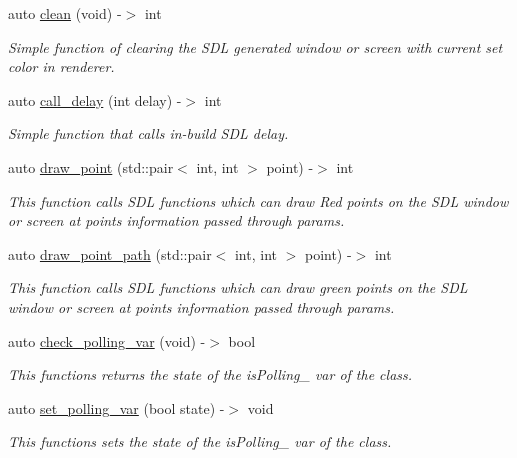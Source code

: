 \begin{DoxyCompactItemize}
auto \hyperlink{class_sdl__wrapper_a102c591db34f2174164b151e5f0bee65}{clean} (void) -\/$>$ int
\begin{DoxyCompactList}\small\item\em Simple function of clearing the S\+DL generated window or screen with current set color in renderer. \end{DoxyCompactList}\item 
auto \hyperlink{class_sdl__wrapper_a1e135dea28c8539c5b68b4854ae2685a}{call\+\_\+delay} (int delay) -\/$>$ int
\begin{DoxyCompactList}\small\item\em Simple function that calls in-\/build S\+DL delay. \end{DoxyCompactList}\item 
auto \hyperlink{class_sdl__wrapper_a85ddf458d2ec28795cabac12aea2d89b}{draw\+\_\+point} (std\+::pair$<$ int, int $>$ point) -\/$>$ int
\begin{DoxyCompactList}\small\item\em This function calls S\+DL functions which can draw Red points on the S\+DL window or screen at points information passed through params. \end{DoxyCompactList}\item 
auto \hyperlink{class_sdl__wrapper_a9241d991148d03b9fdff709391641181}{draw\+\_\+point\+\_\+path} (std\+::pair$<$ int, int $>$ point) -\/$>$ int
\begin{DoxyCompactList}\small\item\em This function calls S\+DL functions which can draw green points on the S\+DL window or screen at points information passed through params. \end{DoxyCompactList}\item 
auto \hyperlink{class_sdl__wrapper_a4555757250790565b641018ac34731f2}{check\+\_\+polling\+\_\+var} (void) -\/$>$ bool
\begin{DoxyCompactList}\small\item\em This functions returns the state of the is\+Polling\+\_\+ var of the class. \end{DoxyCompactList}\item 
auto \hyperlink{class_sdl__wrapper_a3cc434ee825f4b1e36ef26384e30cb70}{set\+\_\+polling\+\_\+var} (bool state) -\/$>$ void
\begin{DoxyCompactList}\small\item\em This functions sets the state of the is\+Polling\+\_\+ var of the class. \end{DoxyCompactList}\end{DoxyCompactItemize}


